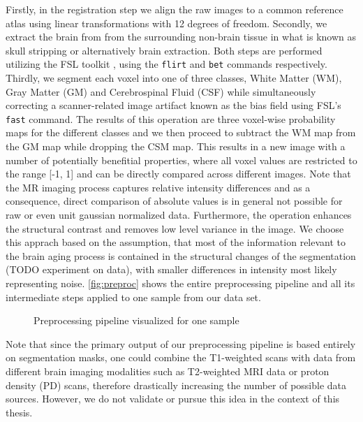 Firstly, in the registration step we align the raw images to a common reference atlas using linear transformations with 12 degrees of freedom. Secondly, we extract the brain from from the surrounding non-brain tissue in what is known as skull stripping or alternatively brain extraction. Both steps are performed utilizing the FSL toolkit \cite{jenkinson2012fsl}, using the \texttt{flirt} \cite{jenkinson2001global} \cite{jenkinson2002improved} and \texttt{bet} \cite{smith2002fast} \cite{jenkinson2005bet2} commands respectively. Thirdly, we segment each voxel into one of three classes, White Matter (WM), Gray Matter (GM) and Cerebrospinal Fluid (CSF) while simultaneously correcting a scanner-related image artifact known as the bias field using FSL's \texttt{fast} \cite{zhang2001segmentation} command. The results of this operation are three voxel-wise probability maps for the different classes and we then proceed to subtract the WM map from the GM map while dropping the CSM map. This results in a new image with a number of potentially benefitial properties, where all voxel values are restricted to the range [-1, 1] and can be directly compared across different images. Note that the MR imaging process captures relative intensity differences and as a consequence, direct comparison of absolute values is in general not possible for raw or even unit gaussian normalized data. Furthermore, the operation enhances the structural contrast and removes low level variance in the image. We choose this apprach based on the assumption, that most of the information relevant to the brain aging process is contained in the structural changes of the segmentation (TODO experiment on data), with smaller differences in intensity most likely representing noise. \autoref{fig:preproc} shows the entire preprocessing pipeline and all its intermediate steps applied to one sample from our data set.

\begin{figure}
	\noindent\makebox[1.1\textwidth]{
		\centering
		
	}
	\caption{Preprocessing pipeline visualized for one sample}
	\label{fig:preproc}
\end{figure}

Note that since the primary output of our preprocessing pipeline is based entirely on segmentation masks, one could combine the T1-weighted scans with data from different brain imaging modalities such as T2-weighted MRI data or proton density (PD) scans, therefore drastically increasing the number of possible data sources. However, we do not validate or pursue this idea in the context of this thesis.

